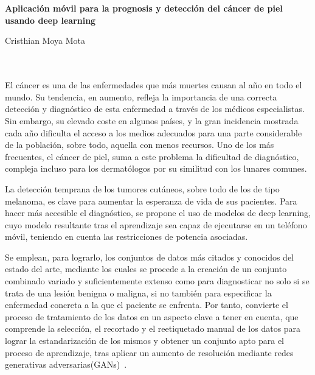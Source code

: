 \chapter*{}






\cleardoublepage
\thispagestyle{empty}

\begin{center}
{\large\bfseries Aplicación móvil para la prognosis y detección del cáncer de piel usando deep learning}\\
\end{center}
\begin{center}
Cristhian Moya Mota\\
\end{center}

\\

\vspace{0.7cm}
\\

El cáncer es una de las enfermedades que más muertes causan al año en todo el mundo. Su tendencia, en aumento, refleja la importancia de una correcta detección y diagnóstico de esta enfermedad a través de los médicos especialistas. Sin embargo, su elevado coste en algunos países, y la gran incidencia mostrada cada año dificulta el acceso a los medios adecuados para una parte considerable de la población, sobre todo, aquella con menos recursos. Uno de los más frecuentes, el cáncer de piel, suma a este problema la dificultad de diagnóstico, compleja incluso para los dermatólogos por su similitud con los lunares comunes.

La detección temprana de los tumores cutáneos, sobre todo de los de tipo melanoma, es clave para aumentar la esperanza de vida de sus pacientes. Para hacer más accesible el diagnóstico, se propone el uso de modelos de deep learning, cuyo modelo resultante tras el aprendizaje sea capaz de ejecutarse en un teléfono móvil, teniendo en cuenta las restricciones de potencia asociadas.

Se emplean, para lograrlo, los conjuntos de datos más citados y conocidos del estado del arte, mediante los cuales se procede a la creación de un conjunto combinado variado y suficientemente extenso como para diagnosticar no solo si se trata de una lesión benigna o maligna, si no también para especificar la enfermedad concreta a la que el paciente se enfrenta. Por tanto, convierte el proceso de tratamiento de los datos en un aspecto clave a tener en cuenta, que comprende la selección, el recortado y el reetiquetado manual de los datos para lograr la estandarización de los mismos y obtener un conjunto apto para el proceso de aprendizaje, tras aplicar un aumento de resolución mediante redes generativas adversarias(GANs)~\cite{goodfellow2014generative}.

